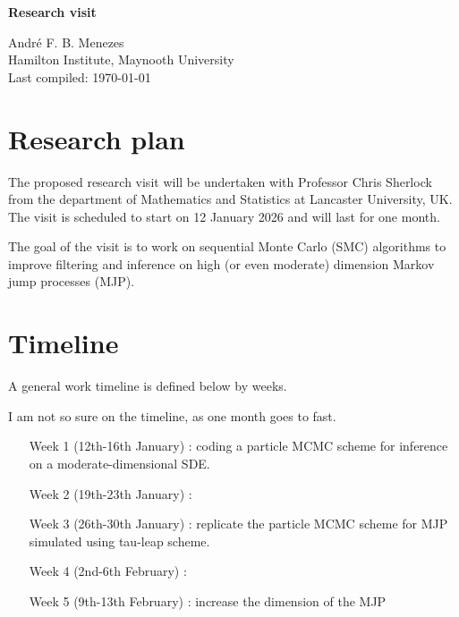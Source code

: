 \documentclass[12pt,a4paper]{article}
\begin{document}
\onehalfspacing
\linenumbers


\begin{center}
    \textbf{Research visit}\\\smallskip

    Andr\'{e} F. B. Menezes\\
    Hamilton Institute, Maynooth University \\
    Last compiled: \today\vspace{-\medskipamount}

\end{center}


\section{Research plan}

The proposed research visit will be undertaken with Professor Chris Sherlock
from the department of Mathematics and Statistics at Lancaster University, UK.
The visit is scheduled to start on 12 January 2026 and will last for one month.

The goal of the visit is to work on sequential Monte Carlo (SMC) algorithms to
improve filtering and inference on high (or even moderate) dimension Markov
jump processes (MJP).

\section{Timeline}
A general work timeline is defined below by weeks.

I am not so sure on the timeline, as one month goes to fast.


\begin{itemize}
	\item[Week 1 (12th-16th January)]: coding a particle MCMC scheme for
	inference on a moderate-dimensional SDE.

	\item[Week 2 (19th-23th January)]:

	\item[Week 3 (26th-30th January)]: replicate the particle MCMC scheme for MJP
	simulated using tau-leap scheme.

	\item[Week 4 (2nd-6th February)]:

	\item[Week 5 (9th-13th February)]: increase the dimension of the MJP
\end{itemize}





\end{document}
